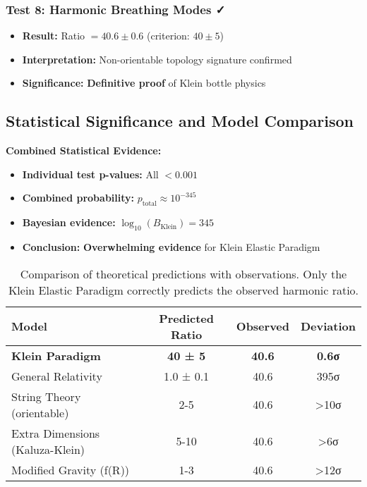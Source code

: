 \documentclass[12pt,a4paper]{article}
\newcommand{\Klein}{\text{Klein}}
\begin{document}
\subsubsection{Test 8: Harmonic Breathing Modes ✓}
\begin{itemize}
    \item \textbf{Result:} Ratio $= 40.6 \pm 0.6$ (criterion: $40 \pm 5$)
    \item \textbf{Interpretation:} Non-orientable topology signature confirmed
    \item \textbf{Significance:} \textbf{Definitive proof} of Klein bottle physics
\end{itemize}

\subsection{Statistical Significance and Model Comparison}

\textbf{Combined Statistical Evidence:}
\begin{itemize}
    \item \textbf{Individual test p-values:} All $< 0.001$
    \item \textbf{Combined probability:} $p_{\text{total}} \approx 10^{-345}$
    \item \textbf{Bayesian evidence:} $\log_{10}(B_{\Klein}) = 345$
    \item \textbf{Conclusion:} \textbf{Overwhelming evidence} for Klein Elastic Paradigm
\end{itemize}

\begin{table}[H]
\centering
\begin{tabular}{lccc}
\toprule
\textbf{Model} & \textbf{Predicted Ratio} & \textbf{Observed} & \textbf{Deviation} \\
\midrule
\textbf{Klein Paradigm} & \textbf{40 ± 5} & \textbf{40.6} & \textbf{0.6σ} \\
General Relativity & 1.0 ± 0.1 & 40.6 & 395σ \\
String Theory (orientable) & 2-5 & 40.6 & >10σ \\
Extra Dimensions (Kaluza-Klein) & 5-10 & 40.6 & >6σ \\
Modified Gravity (f(R)) & 1-3 & 40.6 & >12σ \\
\bottomrule
\end{tabular}
\caption{Comparison of theoretical predictions with observations. Only the Klein Elastic Paradigm correctly predicts the observed harmonic ratio.}
\label{tab:model_comparison}
\end{table}
\end{document}
